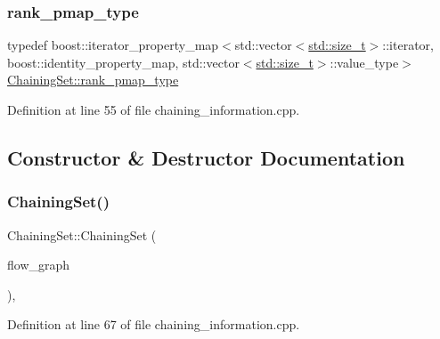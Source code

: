 \mbox{\label{structChainingSet_aebbcd031d5f20a8ff678fff4688c9d77}} 
\subsubsection{\texorpdfstring{rank\+\_\+pmap\+\_\+type}{rank\_pmap\_type}}
{\footnotesize\ttfamily typedef boost\+::iterator\+\_\+property\+\_\+map$<$std\+::vector$<$\hyperlink{tutorial__pact__2019_2Introduction_2sixth_2test_8c_a7c94ea6f8948649f8d181ae55911eeaf}{std\+::size\+\_\+t}$>$\+::iterator, boost\+::identity\+\_\+property\+\_\+map, std\+::vector$<$\hyperlink{tutorial__pact__2019_2Introduction_2sixth_2test_8c_a7c94ea6f8948649f8d181ae55911eeaf}{std\+::size\+\_\+t}$>$\+::value\+\_\+type$>$ \hyperlink{structChainingSet_aebbcd031d5f20a8ff678fff4688c9d77}{Chaining\+Set\+::rank\+\_\+pmap\+\_\+type}}



Definition at line 55 of file chaining\+\_\+information.\+cpp.



\subsection{Constructor \& Destructor Documentation}
\mbox{\label{structChainingSet_a3793419c343c24a615ab1f6c008ce7e6}} 
\subsubsection{\texorpdfstring{Chaining\+Set()}{ChainingSet()}}
{\footnotesize\ttfamily Chaining\+Set\+::\+Chaining\+Set (\begin{DoxyParamCaption}\item[{const \hyperlink{op__graph_8hpp_a9a0b240622c47584bee6951a6f5de746}{Op\+Graph\+Const\+Ref}}]{flow\+\_\+graph }\end{DoxyParamCaption})\hspace{0.3cm}{\ttfamily [inline]}, {\ttfamily [explicit]}}



Definition at line 67 of file chaining\+\_\+information.\+cpp.



